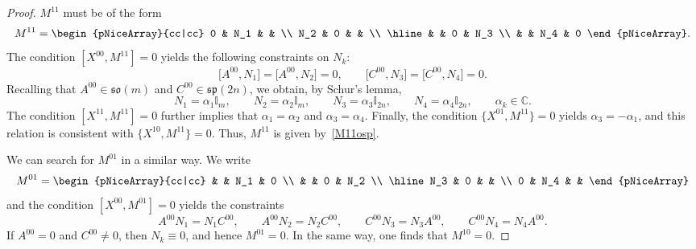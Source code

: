 \documentclass[pdftex]{sigma}
\numberwithin{equation}{section}
\theoremstyle{definition}
\def\so{\mathfrak{so}}
\def\sp{\mathfrak{sp}}
\begin{document}
\begin{proof}
	$M^{11}$ must be of the form
	\begin{equation*}
		M^{11} =
		\begin{pNiceArray}{cc|cc}
			0 & N_1 & &
			\\
			N_2 & 0 & &
			\\ \hline
			& & 0 & N_3
			\\
			& & N_4 & 0
		\end{pNiceArray}.
	\end{equation*}
	The condition $[X^{00}, M^{11}] = 0$ yields the following constraints on $N_k$:
	\begin{equation*}
		\bigl[A^{00},N_1\bigr] = \bigl[A^{00},N_2\bigr] = 0, \qquad \bigl[C^{00},N_3\bigr] = \bigl[C^{00},N_4\bigr] = 0.
	\end{equation*}
	Recalling that $ A^{00} \in \so(m) $ and $ C^{00} \in \sp(2n)$, we obtain, by Schur's lemma,
	\begin{equation*}
		N_1 = \alpha_1 \mathbb{I}_m, \qquad N_2 = \alpha_2 \mathbb{I}_m, \qquad
		N_3 = \alpha_3 \mathbb{I}_{2n}, \qquad N_4 = \alpha_4 \mathbb{I}_{2n}, \qquad \alpha_k \in \mathbb{C}.
	\end{equation*}
	The condition $[X^{11}, M^{11}] = 0$ further implies that $\alpha_1 = \alpha_2$ and $\alpha_3 = \alpha_4$. Finally, the condition $\bigl\{ X^{01}, M^{11}\bigr\} = 0$ yields $ \alpha_3 = -\alpha_1$, and this relation is consistent with $\bigl\{ X^{10}, M^{11}\bigr\} = 0$.
	Thus, $M^{11}$ is given by~\eqref{M11osp}.

	We can search for $M^{01}$ in a similar way. We write
\begin{equation*}
	M^{01} =
	\begin{pNiceArray}{cc|cc}
		& & N_1 & 0
		\\
		& & 0 & N_2 \\ \hline
		N_3 & 0 & &
		\\
		0 & N_4 & &
	\end{pNiceArray}
\end{equation*}
and the condition $[X^{00}, M^{01}] = 0$ yields the constraints
\[
	A^{00} N_1 = N_1 C^{00}, \qquad A^{00} N_2 = N_2 C^{00}, \qquad
	C^{00} N_3 = N_3 A^{00}, \qquad C^{00} N_4 = N_4 A^{00}.
\]
If $ A^{00} = 0 $ and $ C^{00} \neq 0$, then $ N_k \equiv 0$, and hence $ M^{01} = 0.$
In the same way, one finds that $M^{10} = 0$.
\end{proof}
\end{document}
